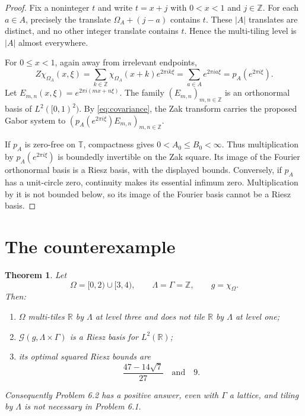 \documentclass[11pt]{article}
\newtheorem{theorem}{Theorem}
\newcommand{\R}{\mathbb R}
\newcommand{\Z}{\mathbb Z}
\newcommand{\T}{\mathbb T}
\newcommand{\cG}{\mathcal G}
\begin{document}
\begin{proof}
Fix a noninteger $t$ and write $t=x+j$ with $0<x<1$ and $j\in\Z$.
For each $a\in A$, precisely the translate
$\Omega_A+(j-a)$ contains $t$. These $|A|$ translates are distinct, and no
other integer translate contains $t$. Hence the multi-tiling level is $|A|$
almost everywhere.

For $0\leq x<1$, again away from irrelevant endpoints,
\[
 Z\chi_{\Omega_A}(x,\xi)
 =\sum_{k\in\Z}\chi_{\Omega_A}(x+k)e^{2\pi i k\xi}
 =\sum_{a\in A}e^{2\pi i a\xi}
 =p_A(e^{2\pi i\xi}).
\]
Let $E_{m,n}(x,\xi)=e^{2\pi i(mx+n\xi)}$. The family
$(E_{m,n})_{m,n\in\Z}$ is an orthonormal basis of $L^2([0,1)^2)$.
By \eqref{eq:covariance}, the Zak transform carries the proposed Gabor
system to $(p_A(e^{2\pi i\xi})E_{m,n})_{m,n\in\Z}$.

If $p_A$ is zero-free on $\T$, compactness gives $0<A_0\leq B_0<\infty$.
Thus multiplication by $p_A(e^{2\pi i\xi})$ is boundedly invertible on the
Zak square. Its image of the Fourier orthonormal basis is a Riesz basis,
with the displayed bounds. Conversely, if $p_A$ has a unit-circle zero,
continuity makes its essential infimum zero. Multiplication by it is not
bounded below, so its image of the Fourier basis cannot be a Riesz basis.
\end{proof}

\section{The counterexample}

\begin{theorem}\label{thm:counterexample}
Let
\[
 \Omega=[0,2)\cup[3,4),\qquad \Lambda=\Gamma=\Z,
 \qquad g=\chi_\Omega.
\]
Then:
\begin{enumerate}
\item $\Omega$ multi-tiles $\R$ by $\Lambda$ at level three and does not tile
      $\R$ by $\Lambda$ at level one;
\item $\cG(g,\Lambda\times\Gamma)$ is a Riesz basis for $L^2(\R)$;
\item its optimal squared Riesz bounds are
\[
  \frac{47-14\sqrt7}{27}\quad\text{and}\quad 9.
\]
\end{enumerate}
Consequently Problem 6.2 has a positive answer, even with $\Gamma$ a lattice,
and tiling by $\Lambda$ is not necessary in Problem 6.1.
\end{theorem}
\end{document}
